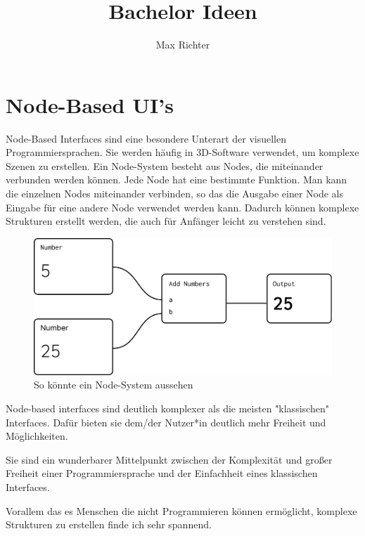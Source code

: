 \documentclass{article}
\title{Bachelor Ideen}
\author{Max Richter}
\begin{document}
\raggedright
\maketitle
\pagebreak
\section{Node-Based UI's}
Node-Based Interfaces sind eine besondere Unterart der visuellen Programmiersprachen. 
Sie werden häufig in 3D-Software verwendet, um komplexe Szenen zu erstellen. 
Ein Node-System besteht aus Nodes, die miteinander verbunden werden können. 
Jede Node hat eine bestimmte Funktion. Man kann die einzelnen Nodes miteinander verbinden, so das die Ausgabe einer Node als Eingabe für eine andere Node verwendet werden kann.
\linebreak
\linebreak
Dadurch können komplexe Strukturen erstellt werden, die auch für Anfänger leicht zu verstehen sind.
\linebreak
\linebreak
\begin{figure}[h]
\includegraphics[width=\textwidth]{ideas/nodes.pdf}
\caption{So könnte ein Node-System aussehen}
\end{figure}

Node-based interfaces sind deutlich komplexer als die meisten "klassischen" Interfaces. Dafür bieten sie dem/der Nutzer*in deutlich mehr Freiheit und Möglichkeiten. 
\linebreak

Sie sind ein wunderbarer Mittelpunkt zwischen der Komplexität und großer Freiheit einer Programmiersprache und der Einfachheit eines klassischen Interfaces.

Vorallem das es Menschen die nicht Programmieren können ermöglicht, komplexe Strukturen zu erstellen finde ich sehr spannend.
\end{document}
